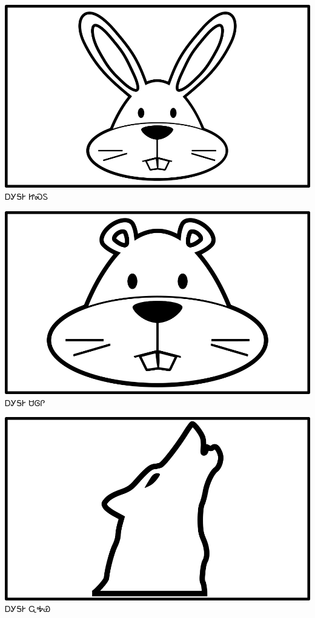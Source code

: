 \documentclass[avery5371]{flashcards}%
\begin{document}
\begin{flashcard}{
\includegraphics[width=0.95\columnwidth,height=.51\columnwidth,keepaspectratio]{../artwork/objects-animate/jisdu}
}\Huge ᎠᎩᎦᎨ ᏥᏍᏚ
\end{flashcard}

\begin{flashcard}{
\includegraphics[width=0.95\columnwidth,height=.51\columnwidth,keepaspectratio]{../artwork/objects-animate/saloli}
}\Huge ᎠᎩᎦᎨ ᏌᎶᎵ
\end{flashcard}

\begin{flashcard}{
\includegraphics[width=0.95\columnwidth,height=.51\columnwidth,keepaspectratio]{../artwork/objects-animate/wahya}
}\Huge ᎠᎩᎦᎨ ᏩᎭᏯ
\end{flashcard}
\end{document}
